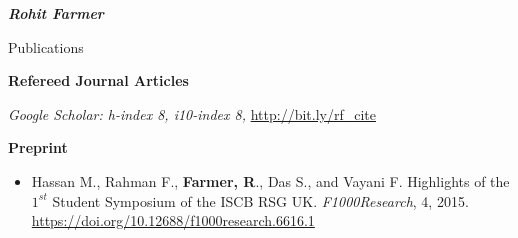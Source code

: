 \documentclass[10pt]{article}
\begin{document}
\begin{cv}{\huge \it \bfseries Rohit Farmer}
\begin{cvlist}{Publications}
\vskip3pt
\item {\bf Refereed Journal Articles}
\item {\textit{Google Scholar: h-index 8, i10-index 8,} \url{http://bit.ly/rf_cite}}
\vskip3pt
\item{ }


\vskip3pt
\item {\textbf{Preprint}}
\item {\begin{itemize}\item Hassan M.,  Rahman F., \textbf{Farmer, R}., Das S., and Vayani F. Highlights of the $1^{st}$ Student Symposium of the ISCB RSG UK. \emph{F1000Research}, 4, 2015. \url{https://doi.org/10.12688/f1000research.6616.1} \end{itemize}}

\end{cvlist}
\end{cv}
\end{document}
